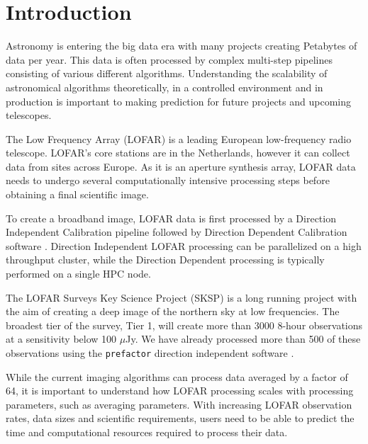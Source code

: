 \documentclass[preprint,5p]{elsarticle}
\begin{document}
%

\section{\label{sec:intro}Introduction }

Astronomy is entering the big data era with many projects creating Petabytes of data per year. This data is often processed by complex multi-step pipelines consisting of various different algorithms. Understanding the scalability of astronomical algorithms theoretically, in a controlled environment and in production is important to making prediction for future projects and upcoming telescopes. 

The Low Frequency Array (LOFAR) \citep{LOFAR} is a leading European low-frequency radio telescope. LOFAR's core stations are in the Netherlands, however it can collect data from sites across Europe. As it is an aperture synthesis array, LOFAR data needs to undergo several computationally intensive processing steps before obtaining a final scientific image. 

To create a broadband image, LOFAR data is first processed by a Direction Independent Calibration pipeline followed by Direction Dependent Calibration software \citep{lofar_prefactor, Wendy_bootes,tassesmirnov, tasse2018faceting}. Direction Independent LOFAR processing can be parallelized on a high throughput cluster, while the Direction Dependent processing is typically performed on a single HPC node. 

The LOFAR Surveys Key Science Project (SKSP) \citep{lotss, LOTSS_DR2} is a long running project with the aim of creating a deep image of the northern sky at low frequencies. The broadest tier of the survey, Tier 1, will create more than 3000 8-hour observations at a sensitivity below 100 $\mu$Jy. We have already processed more than 500 of these observations using the \texttt{prefactor} direction independent software \citep{prefactor_zenodo}. 

While the current imaging algorithms can process data averaged by a factor of 64, it is important to understand how LOFAR processing scales with processing parameters, such as averaging parameters. With increasing LOFAR observation rates, data sizes and scientific requirements, users need to be able to predict the time and computational resources required to process their data.  
\end{document}
